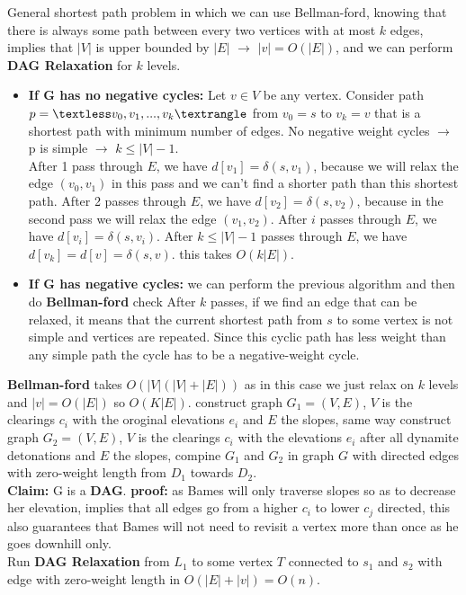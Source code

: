 \documentclass[12pt,twoside]{article}
\begin{document}
\begin{problems}
\newpage
\problem  %
General shortest path problem in which we can use Bellman-ford, knowing that there is always some path between every 
two vertices with at most $k$ edges, implies that $|V|$ is upper bounded by $|E|$ $\rightarrow$ $|v| = O(|E|)$, and 
we can perform \textbf{DAG Relaxation} for $k$ levels. 
\begin{itemize}
  \item \textbf{If G has no negative cycles:} 
    Let $v \in V$ be any vertex. Consider path $p = \textless v_0, v_1, . . . , v_k⟩$ from $v_0 = s$ to $v_k = v$
    that is a shortest path with minimum number of edges. No negative weight cycles $\rightarrow$ p is simple $\rightarrow$
    $k \leq |V| - 1$. \\
    After 1 pass through $E$, we have $d[v_1] = \delta(s, v_1)$, because we will relax the edge $(v_0, v_1)$ in this pass
    and we can’t find a shorter path than this shortest path. 
    After 2 passes through $E$, we have $d[v_2] = \delta(s, v_2)$, 
     because in the second pass we will relax the edge $(v_1, v_2)$.
    After $i$ passes through $E$, we have $d[v_i] = \delta(s, v_i)$.
    After $k \leq |V| - 1$ passes through $E$, we have $d[v_k] = d[v] = \delta(s, v)$. 
    this takes $O(k|E|)$. 
  \item \textbf{If G has negative cycles:} we can perform the previous algorithm and then do \textbf{Bellman-ford} check
    After $k$ passes, if we find an edge that can be relaxed, it means that the current
    shortest path from $s$ to some vertex is not simple and vertices are repeated. Since this
    cyclic path has less weight than any simple path the cycle has to be a negative-weight
    cycle.
\end{itemize}
  \textbf{Bellman-ford} takes $O(|V|(|V| + |E|))$ as in this case we just relax on $k$ levels and $|v| = O(|E|)$ 
  so $O(K|E|)$.
\newpage
\problem  %
  construct graph $G_1 = (V, E)$, $V$ is the clearings $c_i$ with the oroginal elevations $e_i$ and $E$ the slopes, 
  same way construct graph $G_2 = (V, E)$, $V$ is the clearings $c_i$ with the elevations $e_i$ after all dynamite 
  detonations and $E$ the slopes, compine $G_1$ and $G_2$ in graph $G$ with directed edges with zero-weight length from $D_1$ towards $D_2$. \\
  \textbf{Claim:} G is a \textbf{DAG}. 
  \textbf{proof:} as Bames will only traverse slopes so as to decrease her elevation, implies that all edges go from 
  a higher $c_i$ to lower $c_j$ \Rightarrow directed, this also guarantees that Bames will not need to revisit a vertex 
  more than once as he goes downhill only. \\

  Run \textbf{DAG Relaxation} from $L_1$ to some vertex $T$ connected to $s_1$ and $s_2$ with 
  edge with zero-weight length in $O(|E| + |v|) = O(n)$.
\newpage
\problem  %

\newpage
\problem  %

\newpage
\problem  %

\end{problems}
\end{document}

